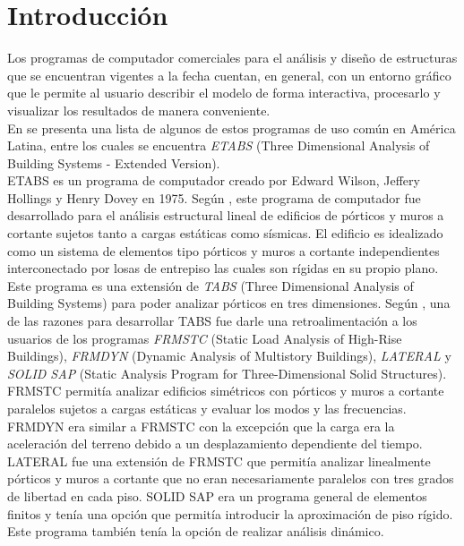 \chapter{Introducción}
\label{chap:antecedentes}

Los programas de computador comerciales para el análisis y diseño de estructuras que se encuentran vigentes a la fecha cuentan, en general, con un entorno gráfico que le permite al usuario describir el modelo de forma interactiva, procesarlo y visualizar los resultados de manera conveniente.\\

En \cite{escamilla1995microcomputadores} se presenta una lista de algunos de estos programas de uso común en América Latina, entre los cuales se encuentra \emph{ETABS} (Three Dimensional Analysis of Building Systems - Extended Version).\\

ETABS es un programa de computador creado por Edward Wilson, Jeffery Hollings y Henry Dovey en 1975. Según \cite{ETABS1975}, este programa de computador fue desarrollado para el análisis estructural lineal de edificios de pórticos y muros a cortante sujetos tanto a cargas estáticas como sísmicas. El edificio es idealizado como un sistema de elementos tipo pórticos y muros a cortante independientes interconectado por losas de entrepiso las cuales son rígidas en su propio plano. \\

Este programa es una extensión de \emph{TABS} (Three Dimensional Analysis of  Building Systems) para poder analizar pórticos en tres dimensiones. Según \cite{ETABS1972}, una de las razones para desarrollar TABS fue darle una retroalimentación a los usuarios de los programas \emph{FRMSTC} (Static Load Analysis of High-Rise Buildings), \emph{FRMDYN} (Dynamic Analysis of Multistory Buildings), \emph{LATERAL} y \emph{SOLID SAP} (Static Analysis Program for Three-Dimensional Solid Structures).\\

FRMSTC permitía analizar edificios simétricos con pórticos y muros a cortante paralelos sujetos a cargas estáticas y evaluar los modos y las frecuencias. FRMDYN era similar a FRMSTC con la excepción que la carga era la aceleración del terreno debido a un desplazamiento dependiente del tiempo. LATERAL fue una extensión de FRMSTC que permitía analizar linealmente pórticos y muros a cortante que no eran necesariamente paralelos con tres grados de libertad en cada piso. SOLID SAP era un programa general de elementos finitos y tenía una opción que permitía introducir la aproximación de piso rígido. Este programa también tenía la opción de realizar análisis dinámico.\\

